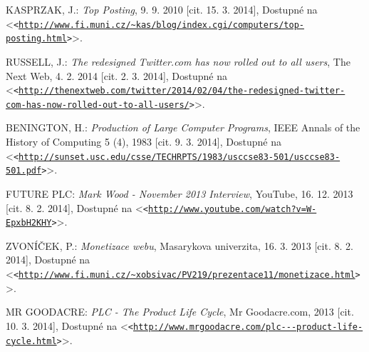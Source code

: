 \documentclass[12pt,twoside,openany]{fithesis}
\let\origurl\url
\def\url#1{\texttt{<\origurl{#1}>}}
\begin{document}
\begin{thebibliography}{99}
KASPRZAK, J.: \emph{Top Posting}, 9. 9. 2010 [cit. 15. 3. 2014], Dostupné na {\textless}\url{http://www.fi.muni.cz/~kas/blog/index.cgi/computers/top-posting.html}{\textgreater}. 

RUSSELL, J.: \emph{The redesigned Twitter.com has now rolled out to all users}, 
The Next Web, 4. 2. 2014 [cit. 2. 3. 2014], Dostupné na {\textless}\url{http://thenextweb.com/twitter/2014/02/04/the-redesigned-twitter-com-has-now-rolled-out-to-all-users/}{\textgreater}. 


BENINGTON, H.: \emph{Production of Large Computer Programs}, IEEE Annals of the History of Computing 5
        (4), 1983 [cit. 9. 3. 2014], Dostupné na {\textless}\url{http://sunset.usc.edu/csse/TECHRPTS/1983/usccse83-501/usccse83-501.pdf}{\textgreater}. 


FUTURE PLC: \emph{Mark Wood - November 2013 Interview}, YouTube, 16. 12. 2013 [cit. 8. 2. 2014], Dostupné na {\textless}\url{http://www.youtube.com/watch?v=W-EpxbH2KHY}{\textgreater}. 

ZVONÍČEK, P.: \emph{Monetizace webu}, Masarykova univerzita, 16. 3. 2013 [cit. 8. 2. 2014], Dostupné na {\textless}\url{http://www.fi.muni.cz/~xobsivac/PV219/prezentace11/monetizace.html}{\textgreater}. 


MR GOODACRE: \emph{PLC - The Product Life Cycle}, Mr Goodacre.com, 2013 [cit. 10. 3. 2014], Dostupné na {\textless}\url{http://www.mrgoodacre.com/plc---product-life-cycle.html}{\textgreater}. 


\end{thebibliography}


\newpage


\renewcommand \listfigurename{Seznam grafů}
\renewcommand \listtablename{Seznam tabulek}
\newcommand{\listappendicesname}{Seznam příloh}
\newcommand{\appendices}[1]{\addcontentsline{apc}{appendices}{#1}}


\newlistof{appendices}{apc}{\listappendicesname}
\end{document}
